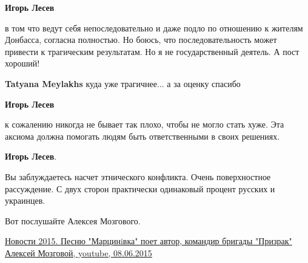 \begin{itemize}
\begin{itemize}
\textbf{Игорь Лесев} 

в том что ведут себя непоследовательно и даже подло по отношению к жителям
Донбасса, согласна полностью. Но боюсь, что последовательность может привести к
трагическим результатам. Но я не государственный деятель. А пост хороший!

\textbf{Tatyana Meylakhs} куда уже трагичнее... а за оценку спасибо

\textbf{Игорь Лесев} 

к сожалению никогда не бывает так плохо, чтобы не могло стать хуже. Эта аксиома
должна помогать людям быть ответственными в своих решениях.

\end{itemize} %

\textbf{Игорь Лесев}.

Вы заблуждаетесь насчет этнического конфликта. Очень поверхностное рассуждение. С
двух сторон практически одинаковый процент русских и украинцев.

Вот послушайте Алексея Мозгового.

\href{https://youtu.be/hEjCho4jz4g}{%
Новости 2015. Песню "Марцинiвка" поет автор, командир бригады "Призрак" Алексей Мозговой, youtube, %
08.06.2015%
}

\end{itemize} %
